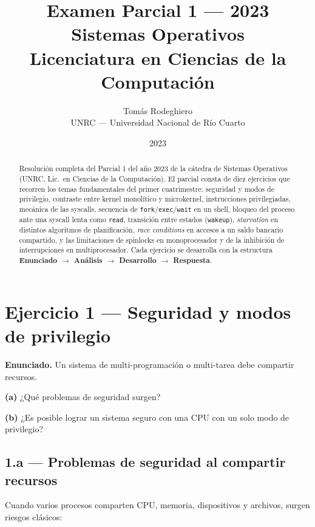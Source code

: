 \documentclass[11pt,a4paper]{article}
\title{
    \vspace{-2.5em}
    \textbf{Examen Parcial 1 --- 2023} \\[0.3em]
    \large Sistemas Operativos \\
    \small Licenciatura en Ciencias de la Computación
}
\author{
    Tomás Rodeghiero \\
    \small UNRC --- Universidad Nacional de Río Cuarto
}
\date{2023}
\begin{document}
\maketitle

\begin{abstract}
\noindent
Resolución completa del Parcial 1 del año 2023 de la cátedra de
Sistemas Operativos (UNRC, Lic.\ en Ciencias de la Computación). El
parcial consta de diez ejercicios que recorren los temas fundamentales
del primer cuatrimestre: seguridad y modos de privilegio,
contraste entre kernel monolítico y microkernel, instrucciones
privilegiadas, mecánica de las syscalls, secuencia de
\texttt{fork}/\texttt{exec}/\texttt{wait} en un shell, bloqueo del
proceso ante una syscall lenta como \texttt{read}, transición entre
estados (\texttt{wakeup}), \emph{starvation} en distintos algoritmos
de planificación, \emph{race conditions} en accesos a un saldo
bancario compartido, y las limitaciones de spinlocks en
monoprocesador y de la inhibición de interrupciones en
multiprocesador. Cada ejercicio se desarrolla con la estructura
\textbf{Enunciado $\to$ Análisis $\to$ Desarrollo $\to$ Respuesta}.
\end{abstract}

\tableofcontents
\bigskip

\section{Ejercicio 1 --- Seguridad y modos de privilegio}

\textbf{Enunciado.} Un sistema de multi-programación o multi-tarea
debe compartir recursos.

\textbf{(a)} ¿Qué problemas de seguridad surgen?

\textbf{(b)} ¿Es posible lograr un sistema seguro con una CPU con un
solo modo de privilegio?

\subsection*{1.a --- Problemas de seguridad al compartir recursos}

Cuando varios procesos comparten CPU, memoria, dispositivos y
archivos, surgen riesgos clásicos:
\end{document}
